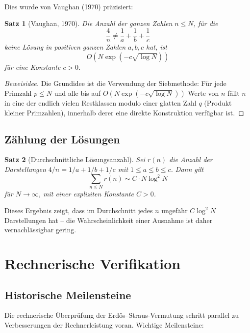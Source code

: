 \documentclass[12pt,a4paper]{amsart}
\newtheorem{theorem}{Satz}[section]
\theoremstyle{definition}
\begin{document}
Dies wurde von Vaughan (1970) präzisiert:

\begin{theorem}[Vaughan, 1970]\label{satz:vaughan}
Die Anzahl der ganzen Zahlen $n \leq N$, für die
\[
  \frac{4}{n} \neq \frac{1}{a} + \frac{1}{b} + \frac{1}{c}
\]
keine Lösung in positiven ganzen Zahlen $a, b, c$ hat, ist
\[
  O\!\left(N \exp(-c\sqrt{\log N})\right)
\]
für eine Konstante $c > 0$.
\end{theorem}

\begin{proof}[Beweisidee]
Die Grundidee ist die Verwendung der Siebmethode: Für jede Primzahl
$p \leq N$ und alle bis auf $O(N \exp(-c\sqrt{\log N}))$ Werte von $n$
fällt $n$ in eine der endlich vielen Restklassen modulo einer glatten
Zahl $q$ (Produkt kleiner Primzahlen), innerhalb derer eine direkte
Konstruktion verfügbar ist.
\end{proof}

\subsection{Zählung der Lösungen}

\begin{theorem}[Durchschnittliche Lösungsanzahl]\label{satz:durchschnitt}
Sei $r(n)$ die Anzahl der Darstellungen $4/n = 1/a + 1/b + 1/c$
mit $1 \leq a \leq b \leq c$.  Dann gilt
\[
  \sum_{n \leq N} r(n) \sim C \cdot N \log^2 N
\]
für $N \to \infty$, mit einer expliziten Konstante $C > 0$.
\end{theorem}

Dieses Ergebnis zeigt, dass im Durchschnitt jedes $n$ ungefähr
$C \log^2 N$ Darstellungen hat -- die Wahrscheinlichkeit einer
Ausnahme ist daher vernachlässigbar gering.

\section{Rechnerische Verifikation}

\subsection{Historische Meilensteine}

Die rechnerische Überprüfung der Erd\H{o}s--Straus-Vermutung schritt
parallel zu Verbesserungen der Rechnerleistung voran.  Wichtige Meilensteine:
\end{document}
